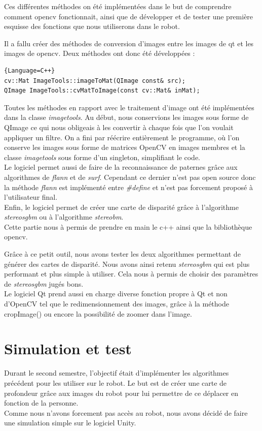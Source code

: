 \documentclass[12pt,a4paper]{report}
\begin{document}
Ces différentes méthodes on été implémentées dans le but de comprendre comment opencv fonctionnait, ainsi que de développer et de tester une première esquisse des fonctions que nous utiliserons dans le robot.

Il a fallu créer des méthodes de conversion d'images entre les images de qt et les images de opencv. Deux méthodes ont donc été développées : 

\begin{lstlisting}{Language=C++}
cv::Mat ImageTools::imageToMat(QImage const& src);
QImage ImageTools::cvMatToImage(const cv::Mat& inMat);
\end{lstlisting}

Toutes les méthodes en rapport avec le traitement d'image ont été implémentées dans la classe \textit{imagetools}. Au début, nous conservions les images sous forme de QImage ce qui nous obligeais à les convertir à chaque fois que l'on voulait appliquer un filtre. On a fini par réécrire entièrement le programme, où l'on conserve les images sous forme de matrices OpenCV en images membres et la classe \textit{imagetools} sous forme d'un singleton, simplifiant le code.\\
Le logiciel permet aussi de faire de la reconnaissance de paternes grâce aux algorithmes de \textit{flann} et de \textit{surf}. Cependant ce dernier n'est pas open source donc la méthode \textit{flann} est implémenté entre \textit{\#define} et n'est pas forcement proposé à l'utilisateur final.\\
Enfin, le logiciel permet de créer une carte de disparité grâce à l'algorithme \textit{stereosgbm} ou à l'algorithme \textit{stereobm}.\\

Cette partie nous à permis de prendre en main le c++ ainsi que la bibliothèque opencv. 

Grâce à ce petit outil, nous avons tester les deux algorithmes permettant de générer des cartes de disparité. Nous avons ainsi retenu \textit{stereosgbm} qui est plus performant et plus simple à utiliser. Cela nous à permis de choisir des paramètres de \textit{stereosgbm} jugés bons.\\

Le logiciel Qt prend aussi en charge diverse fonction propre à Qt et non d'OpenCV tel que le redimensionnement des images, grâce à la méthode cropImage() ou encore la possibilité de zoomer dans l'image.

\section{Simulation et test}
Durant le second semestre, l'objectif était d'implémenter les algorithmes précédent pour les utiliser sur le robot. Le but est de créer une carte de profondeur grâce aux images du robot pour lui permettre de ce déplacer en fonction de la personne.\\
Comme nous n'avons forcement pas accès au robot, nous avons décidé de faire une simulation simple sur le logiciel Unity.\\
\end{document}
